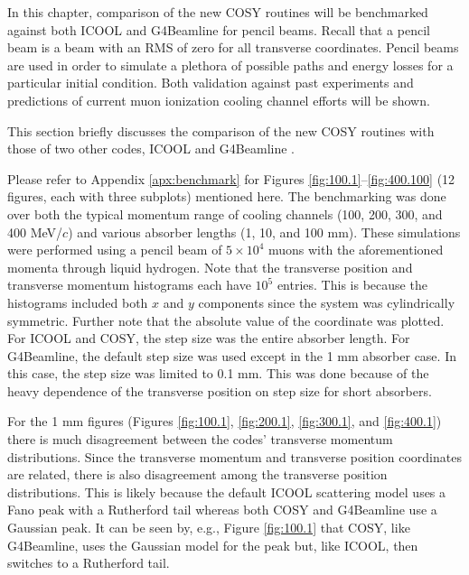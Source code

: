 \par In this chapter, comparison of the new COSY routines will be benchmarked against both ICOOL and G4Beamline for pencil beams. Recall that a pencil beam is a beam with an RMS of zero for all transverse coordinates. Pencil beams are used in order to simulate a plethora of possible paths and energy losses for a particular initial condition. Both validation against past experiments and predictions of current muon ionization cooling channel efforts will be shown.

\label{sec:benchmark}

This section briefly discusses the comparison of the new COSY routines with those of two other codes, ICOOL \cite{icool} and G4Beamline \cite{g4bl}. 

Please refer to Appendix \ref{apx:benchmark} for Figures \ref{fig:100.1}--\ref{fig:400.100} (12 figures, each with three subplots) mentioned here. The benchmarking was done over both the typical momentum range of cooling channels (100, 200, 300, and 400 MeV/$c$) and various absorber lengths (1, 10, and 100 mm). These simulations were performed using a pencil beam of $5\times 10^4$ muons with the aforementioned momenta through liquid hydrogen. Note that the transverse position and transverse momentum histograms each have $10^5$ entries. This is because the histograms included both $x$ and $y$ components since the system was cylindrically symmetric. Further note that the absolute value of the coordinate was plotted. For ICOOL and COSY, the step size was the entire absorber length. For G4Beamline, the default step size was used except in the 1 mm absorber case. In this case, the step size was limited to 0.1 mm. This was done because of the heavy dependence of the transverse position on step size for short absorbers.

For the 1 mm figures (Figures \ref{fig:100.1}, \ref{fig:200.1}, \ref{fig:300.1}, and \ref{fig:400.1}) there is much disagreement between the codes' transverse momentum distributions. Since the transverse momentum and transverse position coordinates are related, there is also disagreement among the transverse position distributions. This is likely because the default ICOOL scattering model uses a Fano peak with a Rutherford tail whereas both COSY and G4Beamline use a Gaussian peak. It can be seen by, e.g., Figure \ref{fig:100.1} that COSY, like G4Beamline, uses the Gaussian model for the peak but, like ICOOL, then switches to a Rutherford tail.

